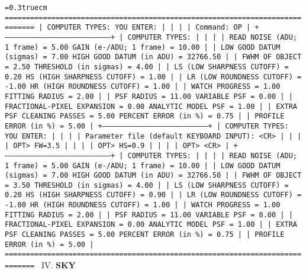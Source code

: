 \bigskip
{\noindent\obeylines\obeyspaces\frenchspacing\tt\baselineskip=0.3truecm
=============================================================================
| COMPUTER TYPES:                                       YOU ENTER:          |
|                                                                           |
| Command:                                              OP                  |
+---------------------------------------------------------------------------+
| COMPUTER TYPES:                                                           |
|                                                                           |
|  READ NOISE (ADU; 1 frame) =  5.00      GAIN (e-/ADU; 1 frame) =    10.00 |
|    LOW GOOD DATUM (sigmas) =  7.00    HIGH GOOD DATUM (in ADU) = 32766.50 |
|             FWHM OF OBJECT =  2.50       THRESHOLD (in sigmas) =     4.00 |
|  LS (LOW SHARPNESS CUTOFF) =  0.20  HS (HIGH SHARPNESS CUTOFF) =     1.00 |
|  LR (LOW ROUNDNESS CUTOFF) = -1.00  HR (HIGH ROUNDNESS CUTOFF) =     1.00 |
|             WATCH PROGRESS =  1.00              FITTING RADIUS =     2.00 |
|                 PSF RADIUS = 11.00                VARIABLE PSF =     0.00 |
| FRACTIONAL-PIXEL EXPANSION =  0.00          ANALYTIC MODEL PSF =     1.00 |
|  EXTRA PSF CLEANING PASSES =  5.00        PERCENT ERROR (in \%) =     0.75 |
|       PROFILE ERROR (in \%) =  5.00                                        |
+---------------------------------------------------------------------------+
| COMPUTER TYPES:                                       YOU ENTER:          |
|                                                                           |
|     Parameter file (default KEYBOARD INPUT):          <CR>                |
|                                                                           |
| OPT>                                                  FW=3.5              |
|                                                                           |
| OPT>                                                  HS=0.9              |
|                                                                           |
| OPT>                                                  <CR>                |
+---------------------------------------------------------------------------+
| COMPUTER TYPES:                                                           |
|                                                                           |
|  READ NOISE (ADU; 1 frame) =  5.00      GAIN (e-/ADU; 1 frame) =    10.00 |
|    LOW GOOD DATUM (sigmas) =  7.00    HIGH GOOD DATUM (in ADU) = 32766.50 |
|             FWHM OF OBJECT =  3.50       THRESHOLD (in sigmas) =     4.00 |
|  LS (LOW SHARPNESS CUTOFF) =  0.20  HS (HIGH SHARPNESS CUTOFF) =     0.90 |
|  LR (LOW ROUNDNESS CUTOFF) = -1.00  HR (HIGH ROUNDNESS CUTOFF) =     1.00 |
|             WATCH PROGRESS =  1.00              FITTING RADIUS =     2.00 |
|                 PSF RADIUS = 11.00                VARIABLE PSF =     0.00 |
| FRACTIONAL-PIXEL EXPANSION =  0.00          ANALYTIC MODEL PSF =     1.00 |
|  EXTRA PSF CLEANING PASSES =  5.00        PERCENT ERROR (in \%) =     0.75 |
|       PROFILE ERROR (in \%) =  5.00                                        |
=============================================================================
}
\vfill
\eject
\noindent IV.  {\bf SKY}

